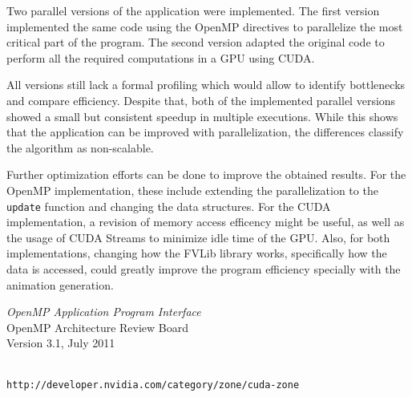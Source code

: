 \documentclass[9pt,twocolumn]{scrartcl}
\begin{document}
Two parallel versions of the application were implemented. The first version implemented the same code using the OpenMP directives to parallelize the most critical part of the program. The second version adapted the original code to perform all the required computations in a GPU using CUDA.

All versions still lack a formal profiling which would allow to identify bottlenecks and compare efficiency. Despite that, both of the implemented parallel versions showed a small but consistent speedup in multiple executions. While this shows that the application can be improved with parallelization, the differences classify the algorithm as non-scalable.

Further optimization efforts can be done to improve the obtained results. For the OpenMP implementation, these include extending the parallelization to the \texttt{update} function and changing the data structures. For the CUDA implementation, a revision of memory access efficency might be useful, as well as the usage of CUDA Streams to minimize idle time of the GPU. Also, for both implementations, changing how the FVLib library works, specifically how the data is accessed, could greatly improve the program efficiency specially with the animation generation.



\begin{thebibliography}{12345}


	\textit{OpenMP Application Program Interface}	\\
	OpenMP Architecture Review Board	\\
	Version 3.1, July 2011

	\hfill\\
	\texttt{\smaller http://developer.nvidia.com/category/zone/cuda-zone}

\end{thebibliography}
\end{document}
